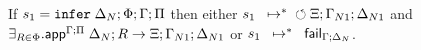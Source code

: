 \iffalse
\begin{theorem}[One rule]\label{thm:one_rule}
If $\transs{\dostate{\Delta}{\Phi}{\Gamma}{\Pi}}{\finalstate{\Xi}{\Gamma_{N1}}{\Delta_{N1}}}$
then $\exists_{R \in \Phi}$ such that
$\transs{\dostate{\Delta}{R}{\Gamma}{\Pi}}{\finalstate{\Xi}{\Gamma_{N1}}{\Delta_{N1}}}$
\end{theorem}
\begin{proof}
Induction on the size of $\Phi$.

Assume $\Phi = A \lolli B, \Phi'$ and $\rulestk = (\Delta; \Phi')$.
Apply two steps to the first state of the assumption to get
$\matstate{A \lolli B}{\rulestk}{\cdot}{\Gamma}{\Delta}{A}{\cdot
   \rightarrow \one}$.

Applying Lemma~\ref{thm:body_match} (body match result) leads to two
subcases:

\begin{itemize}[leftmargin=*]
   \item Match fails: \\
   $\contstate{A \lolli B}{\rulestk}{\cdot}{\Gamma}$ \hfill (1) \\

   $\dostate{\Delta}{\Phi'}{\Gamma}{\Pi}$ \hfill (2) state after (1) \\
   $\transs{\dostate{\Delta}{R'}{\Gamma}{\Pi}}{\finalstate{\Xi}{\Gamma_{N1}}{\Delta_{N1}}}$
   \hfill (3) i.h. on (2) where $R' \in \Phi'$ \\

   \item Match succeeds: \\

   $\matstate{A \lolli B}{\rulestk}{\lstack{C}}{\Gamma}{\Delta_1}{\cdot}{\Delta'
      \rightarrow split(A)}$ \\ \hfill (1) \\
   $\mo \Gamma; \Delta; \cdot; A; B; \cdot; (\cdot, \Delta) \rightarrow \outsem$ \hfill (1)\\
   $\ao \Gamma; \Delta; A \lolli B; (\cdot, \Delta) \rightarrow \outsem$ \hfill (2) rule $\ao \m{rule}$ on (1) \\
   $\doo \Gamma; \Delta; A \lolli B \rightarrow \outsem$ \hfill (3) rule $\doo \m{rule}$ on (2) \\
\end{itemize}
\end{proof}
\fi


\begin{theorem}[Soundness]\label{thm:soundness}
If $s_1 = \mathtt{infer} \; \Delta_N; \Phi; \Gamma; \Pi$
then either $s_1 \;\; \mapsto^{*} \;\; \circlearrowleft \Xi ; \Gamma_{N1}; \Delta_{N1}$
and $\exists_{R \in \Phi}. \mathsf{app}^{\Gamma ; \Pi} \; \Delta_N ; R \rightarrow \Xi; \Gamma_{N1};
      \Delta_{N1}$
or $s_1 \;\; \mapsto^{*} \;\; \mathsf{fail}_{\Gamma; \Delta_N}$.
\end{theorem}


